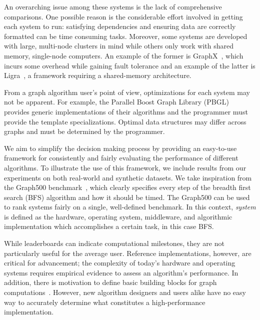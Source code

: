\documentclass[conference]{IEEEtran}
\begin{document}
An overarching issue among these systems is the lack of comprehensive comparisons. One possible reason is the considerable effort involved in getting each system to run: satisfying dependencies and ensuring data are correctly formatted can be time consuming tasks. Moreover, some systems are developed with large, multi-node clusters in mind while others only work with shared memory, single-node computers. An example of the former is GraphX~\cite{Xin:2013:GraphX}, which incurs some overhead while gaining fault tolerance and an example of the latter is Ligra~\cite{Shun:2013:Ligra}, a framework requiring a shared-memory architecture.

From a graph algorithm user's point of view, optimizations for each system may not be apparent. For example, the Parallel Boost Graph Library (PBGL)~\cite{Gregor:2005:PBGL} provides generic implementations of their algorithms and the programmer must provide the template specializations. Optimal data structures may differ across graphs and must be determined by the programmer.

We aim to simplify the decision making process by providing an easy-to-use framework for consistently and fairly evaluating the performance of different algorithms. To illustrate the use of this framework, we include results from our experiments on both real-world and synthetic datasets. We take inspiration from the Graph500 benchmark~\cite{Murphy:2010:Graph500}, which clearly specifies every step of the breadth first search (BFS) algorithm and how it should be timed. The Graph500 can be used to rank systems fairly on a single, well-defined benchmark. In this context, \emph{system} is defined as the hardware, operating system, middleware, and algorithmic implementation which accomplishes a certain task, in this case BFS.

While leaderboards can indicate computational milestones, they are not particularly useful for the average user. Reference implementations, however, are critical for advancement; the complexity of today's hardware and operating systems requires empirical evidence to assess an algorithm's performance. In addition, there is motivation to define basic building blocks for graph computations~\cite{GABB16, Buluc:CombBLAS:2011}. However, new algorithm designers and users alike have no easy way to accurately determine what constitutes a high-performance implementation.
\end{document}
